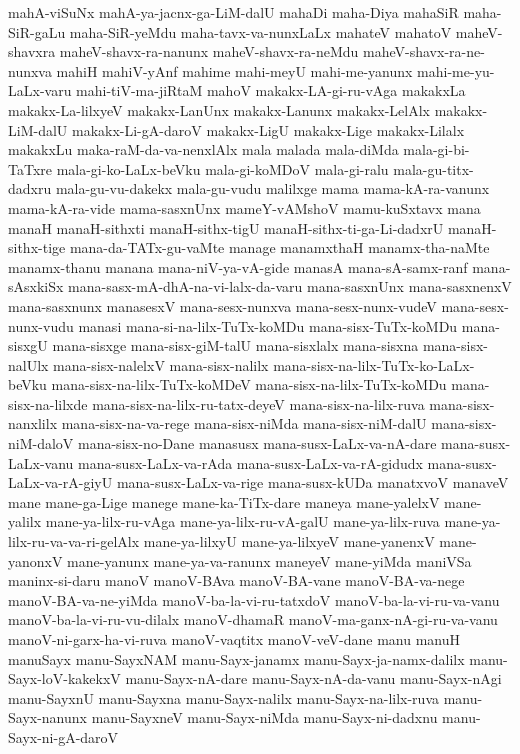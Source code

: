 {mahA-viSuNx
mahA-ya-jacnx-ga-LiM-dalU
mahaDi
maha-Diya
mahaSiR
maha-SiR-gaLu
maha-SiR-yeMdu
maha-tavx-va-nunxLaLx
mahateV
mahatoV
maheV-shavxra
maheV-shavx-ra-nanunx
maheV-shavx-ra-neMdu
maheV-shavx-ra-ne-nunxva
mahiH
mahiV-yAnf
mahime
mahi-meyU
mahi-me-yanunx
mahi-me-yu-LaLx-varu
mahi-tiV-ma-jiRtaM
mahoV
makakx-LA-gi-ru-vAga
makakxLa
makakx-La-lilxyeV
makakx-LanUnx
makakx-Lanunx
makakx-LelAlx
makakx-LiM-dalU
makakx-Li-gA-daroV
makakx-LigU
makakx-Lige
makakx-Lilalx
makakxLu
maka-raM-da-va-nenxlAlx
mala
malada
mala-diMda
mala-gi-bi-TaTxre
mala-gi-ko-LaLx-beVku
mala-gi-koMDoV
mala-gi-ralu
mala-gu-titx-dadxru
mala-gu-vu-dakekx
mala-gu-vudu
malilxge
mama
mama-kA-ra-vanunx
mama-kA-ra-vide
mama-sasxnUnx
mameY-vAMshoV
mamu-kuSxtavx
mana
manaH
manaH-sithxti
manaH-sithx-tigU
manaH-sithx-ti-ga-Li-dadxrU
manaH-sithx-tige
mana-da-TATx-gu-vaMte
manage
manamxthaH
manamx-tha-naMte
manamx-thanu
manana
mana-niV-ya-vA-gide
manasA
mana-sA-samx-ranf
mana-sAsxkiSx
mana-sasx-mA-dhA-na-vi-lalx-da-varu
mana-sasxnUnx
mana-sasxnenxV
mana-sasxnunx
manasesxV
mana-sesx-nunxva
mana-sesx-nunx-vudeV
mana-sesx-nunx-vudu
manasi
mana-si-na-lilx-TuTx-koMDu
mana-sisx-TuTx-koMDu
mana-sisxgU
mana-sisxge
mana-sisx-giM-talU
mana-sisxlalx
mana-sisxna
mana-sisx-nalUlx
mana-sisx-nalelxV
mana-sisx-nalilx
mana-sisx-na-lilx-TuTx-ko-LaLx-beVku
mana-sisx-na-lilx-TuTx-koMDeV
mana-sisx-na-lilx-TuTx-koMDu
mana-sisx-na-lilxde
mana-sisx-na-lilx-ru-tatx-deyeV
mana-sisx-na-lilx-ruva
mana-sisx-nanxlilx
mana-sisx-na-va-rege
mana-sisx-niMda
mana-sisx-niM-dalU
mana-sisx-niM-daloV
mana-sisx-no-Dane
manasusx
mana-susx-LaLx-va-nA-dare
mana-susx-LaLx-vanu
mana-susx-LaLx-va-rAda
mana-susx-LaLx-va-rA-gidudx
mana-susx-LaLx-va-rA-giyU
mana-susx-LaLx-va-rige
mana-susx-kUDa
manatxvoV
manaveV
mane
mane-ga-Lige
manege
mane-ka-TiTx-dare
maneya
mane-yalelxV
mane-yalilx
mane-ya-lilx-ru-vAga
mane-ya-lilx-ru-vA-galU
mane-ya-lilx-ruva
mane-ya-lilx-ru-va-va-ri-gelAlx
mane-ya-lilxyU
mane-ya-lilxyeV
mane-yanenxV
mane-yanonxV
mane-yanunx
mane-ya-va-ranunx
maneyeV
mane-yiMda
maniVSa
maninx-si-daru
manoV
manoV-BAva
manoV-BA-vane
manoV-BA-va-nege
manoV-BA-va-ne-yiMda
manoV-ba-la-vi-ru-tatxdoV
manoV-ba-la-vi-ru-va-vanu
manoV-ba-la-vi-ru-vu-dilalx
manoV-dhamaR
manoV-ma-ganx-nA-gi-ru-va-vanu
manoV-ni-garx-ha-vi-ruva
manoV-vaqtitx
manoV-veV-dane
manu
manuH
manuSayx
manu-SayxNAM
manu-Sayx-janamx
manu-Sayx-ja-namx-dalilx
manu-Sayx-loV-kakekxV
manu-Sayx-nA-dare
manu-Sayx-nA-da-vanu
manu-Sayx-nAgi
manu-SayxnU
manu-Sayxna
manu-Sayx-nalilx
manu-Sayx-na-lilx-ruva
manu-Sayx-nanunx
manu-SayxneV
manu-Sayx-niMda
manu-Sayx-ni-dadxnu
manu-Sayx-ni-gA-daroV
}

